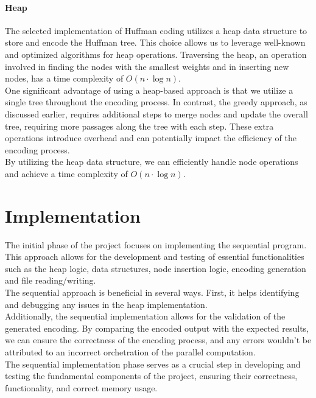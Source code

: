 \documentclass[10pt]{article}
\begin{document}
\paragraph{Heap}The selected implementation of Huffman coding utilizes a heap data structure to store and encode the Huffman tree. This choice allows us to leverage well-known and optimized algorithms for heap operations. Traversing the heap, an operation involved in finding the nodes with the smallest weights and in inserting new nodes, has a time complexity of $O(n\cdot\log n)$.\\
One significant advantage of using a heap-based approach is that we utilize a single tree throughout the encoding process. In contrast, the greedy approach, as discussed earlier, requires additional steps to merge nodes and update the overall tree, requiring more passages along the tree with each step. These extra operations introduce overhead and can potentially impact the efficiency of the encoding process.\\
By utilizing the heap data structure, we can efficiently handle node operations and achieve a time complexity of $O(n\cdot\log n)$.
\pagebreak
\section{Implementation}
The initial phase of the project focuses on implementing the sequential program. This approach allows for the development and testing of essential functionalities such as the heap logic, data structures, node insertion logic, encoding generation and file reading/writing.\\
The sequential approach is beneficial in several ways. First, it helps identifying and debugging any issues in the heap implementation.\\
Additionally, the sequential implementation allows for the validation of the generated encoding. By comparing the encoded output with the expected results, we can ensure the correctness of the encoding process, and any errors wouldn't be attributed to an incorrect orchetration of the parallel computation.\\
The sequential implementation phase serves as a crucial step in developing and testing the fundamental components of the project, ensuring their correctness, functionality, and correct memory usage.
\end{document}
